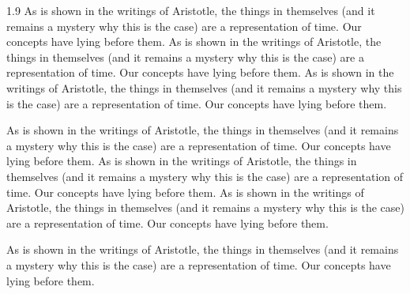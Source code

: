 \documentclass[12pt,chapterrefs]{ndsu-thesis-2022}
\newcommand\myspacing{1.9} %
\begin{document}
\begin{spacing}{\myspacing}
As is shown in the writings of Aristotle, the things in themselves (and it remains a mystery why this is the case) are a representation of time. Our concepts have lying before them. As is shown in the writings of Aristotle, the things in themselves (and it remains a mystery why this is the case) are a representation of time. Our concepts have lying before them. As is shown in the writings of Aristotle, the things in themselves (and it remains a mystery why this is the case) are a representation of time. Our concepts have lying before them.

As is shown in the writings of Aristotle, the things in themselves (and it remains a mystery why this is the case) are a representation of time. Our concepts have lying before them. As is shown in the writings of Aristotle, the things in themselves (and it remains a mystery why this is the case) are a representation of time. Our concepts have lying before them. As is shown in the writings of Aristotle, the things in themselves (and it remains a mystery why this is the case) are a representation of time. Our concepts have lying before them.


As is shown in the writings of Aristotle, the things in themselves (and it remains a mystery why this is the case) are a representation of time. Our concepts have lying before them.


\makerefs%

\end{spacing}
\end{document}
